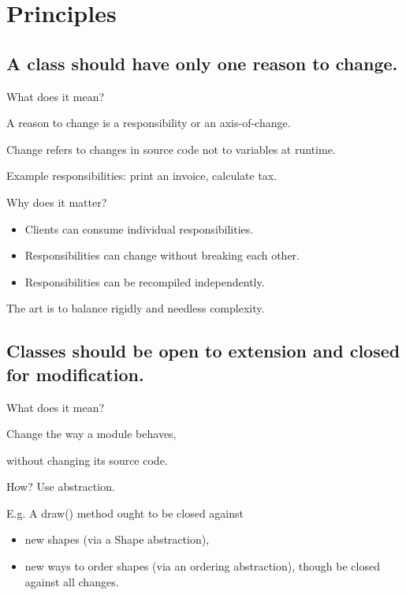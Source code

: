 \documentclass{beamer}
\begin{document}
\section{Principles}

\subsection{A class should have only one reason to change.}

\begin{frame}{What does it mean?}
    \par A reason to change is a responsibility or an axis-of-change.
    \par Change refers to changes in source code not to variables at runtime.
    \par Example responsibilities: print an invoice, calculate tax.
\end{frame}

\begin{frame}{Why does it matter?}
    \begin{itemize}
        \item Clients can consume individual responsibilities.
        \item Responsibilities can change without breaking each other.
        \item Responsibilities can be recompiled independently.
    \end{itemize}
    \par The art is to balance rigidly and needless complexity. 
\end{frame}

\begin{frame}{}
    
\end{frame}

\begin{frame}{}
    
\end{frame}

\subsection{Classes should be open to extension and closed for modification.}

\begin{frame}{What does it mean?}
    \par Change the way a module behaves,
    \par without changing its source code.
    \par How? Use abstraction.
    \par E.g. A draw() method ought to be closed against
    \begin{itemize}
        \item new shapes (via a Shape abstraction),
        \item new ways to order shapes (via an ordering abstraction), though
        \itemcannot be closed against all changes. 
    \end{itemize}
\end{frame}
\end{document}
